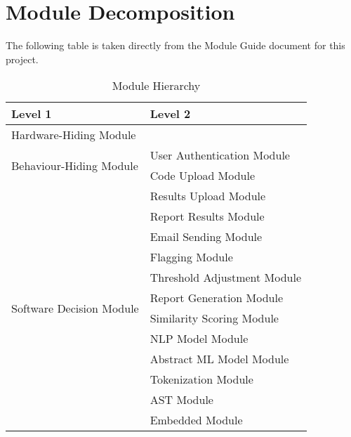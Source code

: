 \documentclass[12pt, titlepage]{article}
\begin{document}
\section{Module Decomposition}

The following table is taken directly from the Module Guide document for this project.

\begin{table}[h!]
    \centering
    \begin{tabular}{p{} p{}}
    \toprule
    \textbf{Level 1} & \textbf{Level 2} \\
    \midrule
    {Hardware-Hiding Module} & ~ \\
    \midrule
    \multirow{2}{*}{Behaviour-Hiding Module} 
    & User Authentication Module \\
    & Code Upload Module \\
    & Results Upload Module \\
    & Report Results Module \\
    & Email Sending Module \\
    & Flagging Module \\
    & Threshold Adjustment Module \\
    \midrule
    \multirow{2}{*}{Software Decision Module} 
    & Report Generation Module \\
    & Similarity Scoring Module \\
    & NLP Model Module \\
    & Abstract ML Model Module \\
    & Tokenization Module \\
    & AST Module \\
    & Embedded Module \\
   
    \bottomrule
    \end{tabular}
    \caption{Module Hierarchy}
    \label{TblMH}
  \end{table}
\newpage
~\newpage



\end{document}
